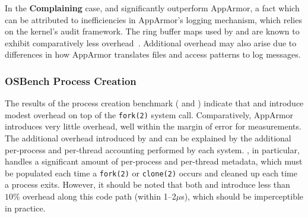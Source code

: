 In the \textbf{Complaining} case, \bpfbox{} and \bpfcontain{} significantly outperform
AppArmor, a fact which can be attributed to inefficiencies in AppArmor's logging
mechanism, which relies on the kernel's audit framework. The ring buffer maps used by
\bpfbox{} and \bpfcontain{} are known to exhibit comparatively less
overhead~\cite{zeng2015_auditing, zhang2021_lsm_file_overhead, nakryiko2020_ringbuf}.
Additional overhead may also arise due to differences in how AppArmor translates files and
access patterns to log messages.

\subsubsection{OSBench Process Creation}

The results of the process creation benchmark ( and ) indicate
that \bpfbox{} and \bpfcontain{} introduce modest overhead on top of the \texttt{fork(2)}
system call.  Comparatively, AppArmor introduces very little overhead, well within the
margin of error for measurements. The additional overhead introduced by \bpfbox{} and
\bpfcontain{} can be explained by the additional per-process and per-thread accounting
performed by each system. \bpfcontain{}, in particular, handles a significant amount of
per-process and per-thread metadata, which must be populated each time a \texttt{fork(2)}
or \texttt{clone(2)} occurs and cleaned up each time a process exits. However, it should
be noted that both \bpfbox{} and \bpfcontain{} introduce less than $10\%$ overhead along
this code path (within 1--2$\mu$s), which should be imperceptible in practice.



\FloatBarrier


